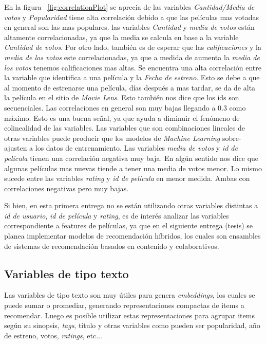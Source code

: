 \documentclass[11pt,a4paper,twoside]{thesis}
\begin{document}
En la figura ~\ref{fig:correlationPlot} se aprecia de las variables
\textit{Cantidad/Media de votos} y \textit{Popularidad} tiene alta correlación
debido a que las películas mas votadas en general son las mas populares. las
variables \textit{Cantidad} y \textit{media de votos} están altamente
correlacionadas, ya que la media se calcula en base a la variable
\textit{Cantidad de votos}. Por otro lado, también es de esperar que las
\textit{calificaciones} y la \textit{media de los votos} este correlacionadas,
ya que a medida de aumenta la \textit{media de los votos} tenemos
calificaciones mas altas. Se encuentra una alta correlación entre la variable
que identifica a una película y la \textit{Fecha de estreno}. Esto se debe a
que al momento de estrenarse una película, días después a mas tardar, se da de
alta la película en el sitio de \textit{Movie Lens}. Esto también nos dice que
los ids son secuenciales. Las correlaciones en general son muy bajas llegando a
0.3 como máximo. Esto es una buena señal, ya que ayuda a diminuir el fenómeno
de colinealidad de las variables. Las variables que son combinaciones lineales
de otras variables puede producir que los modelos de \textit{Machine Learning}
sobre-ajusten a los datos de entrenamiento. Las variables \textit{media de
	votos} y \textit{id de película} tienen una correlación negativa muy baja. En
algún sentido nos dice que algunas películas mas nuevas tiende a tener una
media de votos menor. Lo mismo sucede entre las variables \textit{rating} y
\textit{id de película} en menor medida. Ambas con correlaciones negativas pero
muy bajas.

Si bien, en esta primera entrega no se están utilizando otras variables
distintas a \textit{id de usuario}, \textit{id de película} y \textit{rating},
es de interés analizar las variables correspondiente a features de películas,
ya que en el siguiente entrega (tesis) se planea implementar modelos de
recomendación híbridos, los cuales son ensambles de sistemas de recomendación
basados en contenido y colaborativos.

\subsection{Variables de tipo texto}

Las variables de tipo texto son muy útiles para genera \textit{embeddings}, los
cuales se puede sumar o promediar, generando representaciones compactas de
items a recomendar. Luego es posible utilizar estas representaciones para
agrupar items según su sinopsis, \textit{tags}, título y otras variables como
pueden ser popularidad, año de estreno, votos, \textit{ratings}, etc...
\end{document}
